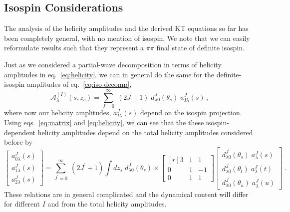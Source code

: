 \documentclass[10pt, aps,prd,amsmath,amssymb,superscriptaddress,onecolumn,
nofootinbib,showpacs,preprintnumbers]{revtex4-1}
\begin{document}
\subsection{Isospin Considerations}
The analysis of the helicity amplitudes and the derived KT equations so far has been completely general, with no mention of isospin. We note that we can easily reformulate results such that they represent a \(\pi\pi\) final state of definite isospin.

Just as we considered a partial-wave decomposition in terms of helicity amplitudes in eq.~\ref{eq:helicity}. we can in general do the same for the definite-isospin amplitudes of eq.~\ref{eq:iso-decomp},
  \begin{equation}
    \mathcal{A}^{(I)}_\lambda(s,z_s) = \sum_{J=0}^\infty \; (2J+1) \; d^J_{\lambda0}(\theta_s) \; a^J_{I\lambda}(s) \,,
  \end{equation}
where now our helicity amplitudes, \(a^{J}_{I \lambda}(s)\) depend on the isospin projection. Using eqs.~\ref{eq:matrix} and \ref{eq:helicity}, we can see that the these isospin-dependent helicity amplitudes depend on the total helicity amplitudes considered before by
  \begin{equation}
    \begin{bmatrix}
      a^J_{0\lambda}(s) \\
      a^J_{1\lambda}(s) \\
      a^J_{2\lambda}(s)
  \end{bmatrix}
     = \sum_{J^\prime =0}^\infty \; (2J^\prime+1) \int dz_s \; d^J_{\lambda0}(\theta_s) \times
    \begin{bmatrix*}[r]
      3 & 1 & 1 \\ 	0 & 1 & -1 \\ 0 & 1 & 1
    \end{bmatrix*}
    \begin{bmatrix}
      d^{J^\prime}_{\lambda0}(\theta_s) \; a^J_{\lambda}(s) \\
      d^{J^\prime}_{\lambda0}(\theta_t) \; a^J_{\lambda}(t) \\
      d^{J^\prime}_{\lambda0}(\theta_u) \; a^J_{\lambda}(u)
  \end{bmatrix} \; .
  \end{equation}
 These relations are in general complicated and the dynamical content will differ for different \(I\) and from the total helicity amplitudes.
\end{document}
